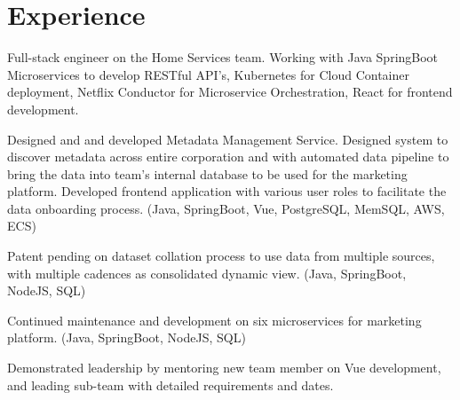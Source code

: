 \documentclass[letterpaper]{deedy-resume-openfont} %
\begin{document}
\hfill
%
%
\begin{minipage}[t]{0.7\textwidth} %


\section{Experience}


\vspace{\topsep} %

\begin{tightemize}
\item Full-stack engineer on the Home Services team. Working with Java SpringBoot Microservices to develop RESTful API's, Kubernetes for Cloud Container deployment, Netflix Conductor for Microservice Orchestration, React for frontend development. 
\end{tightemize}

\sectionsep %




\begin{tightemize}
\item Designed and and developed Metadata Management Service. Designed system to discover metadata across entire corporation and with automated data pipeline to bring the data into team's internal database to be used for the marketing platform. Developed frontend application with various user roles to facilitate the data onboarding process. (Java, SpringBoot, Vue, PostgreSQL, MemSQL, AWS, ECS)
\item Patent pending on dataset collation process to use data from multiple sources, with multiple cadences as consolidated dynamic view. (Java, SpringBoot, NodeJS, SQL)
\item Continued maintenance and development on six microservices for marketing platform. (Java, SpringBoot, NodeJS, SQL)
\item Demonstrated leadership by mentoring new team member on Vue development, and leading sub-team with detailed requirements and dates.
\end{tightemize}


\end{minipage}
\end{document}
